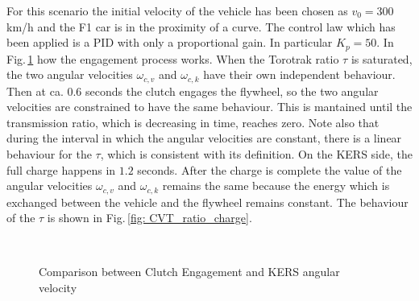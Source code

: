 \documentclass[11pt]{article}
\begin{document}
For this scenario the initial velocity of the vehicle has been chosen as $v_0 = 300$ km/h and the F1 car is in the proximity of a curve. The control law which has been applied is a PID with only a proportional gain. In particular $K_p = 50$. In Fig.\,\ref{fig: Engagement_plus_KERS_Vel_Charge} how the engagement process works. When the Torotrak ratio $\tau$ is saturated, the two angular velocities $\omega_{c,v}$ and $\omega_{c,k}$ have their own independent behaviour. Then at ca. $0.6$ seconds the clutch engages the flywheel, so the two angular velocities are constrained to have the same behaviour. This is mantained until the transmission ratio, which is decreasing in time, reaches zero. Note also that during the interval in which the angular velocities are constant, there is a linear behaviour for the $\tau$, which is consistent with its definition. On the KERS side, the full charge happens in $1.2$ seconds. After the charge is complete the value of the angular velocities $\omega_{c,v}$ and $\omega_{c,k}$ remains the same because the energy which is exchanged between the vehicle and the flywheel remains constant. The behaviour of the $\tau$ is shown in Fig.\,\ref{fig: CVT_ratio_charge}.

\begin{figure}[H]
\centering
{} \quad
{} \\
\caption{Comparison between Clutch Engagement \protect{} and KERS angular velocity \protect{}}
\label{fig: Engagement_plus_KERS_Vel_Charge}
\end{figure}
\end{document}
